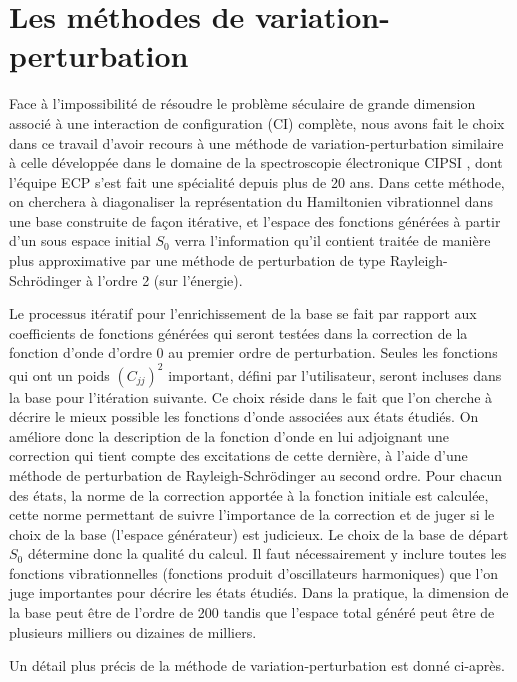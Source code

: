 \section{Les méthodes de variation-perturbation}


Face à l’impossibilité de résoudre le problème séculaire de grande dimension associé à une interaction de configuration (CI) complète, nous avons fait le choix dans ce travail d’avoir recours à une méthode de variation-perturbation similaire à celle développée dans le domaine de la spectroscopie électronique CIPSI \cite{huron1973iterative}, dont l’équipe ECP s’est fait une spécialité depuis plus de 20 ans. Dans cette méthode, on cherchera à diagonaliser la représentation du Hamiltonien vibrationnel dans une base construite de façon itérative, et l’espace des fonctions générées à partir d’un sous espace initial $S_0$ verra l’information qu’il contient traitée de manière plus approximative par une méthode de perturbation de type Rayleigh-Schrödinger à l’ordre 2 (sur l’énergie).

Le processus itératif pour l’enrichissement de la base se fait par rapport aux coefficients de fonctions générées qui seront testées dans la correction de la fonction d’onde d’ordre 0 au premier ordre de perturbation. Seules les fonctions qui ont un poids $(C_{jj})^2$ important, défini par l’utilisateur, seront incluses dans la base pour l’itération suivante. 
Ce choix réside dans le fait que l’on cherche à décrire le mieux possible les fonctions d’onde associées aux états étudiés. On améliore donc la description de la fonction  d’onde en lui adjoignant une correction qui tient compte des excitations de cette dernière, à l’aide d’une méthode de perturbation de Rayleigh-Schrödinger au second ordre. Pour chacun des états, la norme de la correction apportée à la fonction initiale est calculée, cette norme permettant de suivre l’importance de la correction et de juger si le choix de la base (l’espace générateur) est judicieux. Le choix de la base de départ $S_0$ détermine donc la qualité du calcul. Il faut nécessairement y inclure toutes les fonctions vibrationnelles (fonctions produit d’oscillateurs harmoniques) que l’on juge importantes pour décrire les états étudiés. Dans la pratique, la dimension de la base peut être de l’ordre de 200 tandis que l’espace total généré peut être de plusieurs milliers ou dizaines de milliers.

Un détail plus précis de la méthode de variation-perturbation est donné ci-après.


